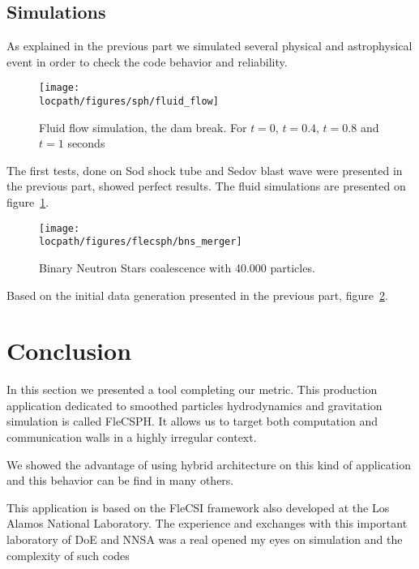 \subsection{Simulations}
As explained in the previous part we simulated several physical and astrophysical event in order to check the code behavior and reliability. 
\begin{figure}[t!]
\centering
\texttt{[image: \\locpath/figures/sph/fluid\_flow]}
\caption{Fluid flow simulation, the dam break. For $t=0$, $t=0.4$, $t=0.8$ and $t=1$ seconds}
\label{fig:fluid_simulation}
\end{figure}
The first tests, done on Sod shock tube and Sedov blast wave were presented in the previous part, showed perfect results. 
The fluid simulations are presented on figure~\ref{fig:fluid_simulation}.

\begin{figure}[t!]
\centering
\texttt{[image: \\locpath/figures/flecsph/bns\_merger]}
\caption{Binary Neutron Stars coalescence with 40.000 particles.}
\label{fig:bns_simulation}
\end{figure}

Based on the initial data generation presented in the previous part, figure~\ref{fig:bns_simulation}.


\section{Conclusion}
In this section we presented a tool completing our metric. 
This production application dedicated to smoothed particles hydrodynamics and gravitation simulation is called FleCSPH. 
It allows us to target both computation and communication walls in a highly irregular context.

We showed the advantage of using hybrid architecture on this kind of application and this behavior can be find in many others. 


This application is based on the FleCSI framework also developed at the Los Alamos National Laboratory.
The experience and exchanges with this important laboratory of DoE and NNSA was a real opened my eyes on simulation and the complexity of such codes
